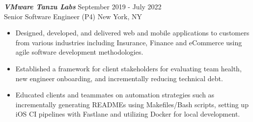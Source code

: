 {\sl \textbf{VMware Tanzu Labs}} \hfill September 2019 - July 2022 \\
Senior Software Engineer (P4) \hfill New York, NY
\begin{itemize}
    \item Designed, developed, and delivered web and mobile applications to customers from various industries including Insurance, Finance and eCommerce using agile software development methodologies.
    \item Established a framework for client stakeholders for evaluating team health, new engineer onboarding, and incrementally reducing technical debt.
    \item Educated clients and teammates on automation strategies such as incrementally generating READMEs using Makefiles/Bash scripts, setting up iOS CI pipelines with Fastlane and utilizing Docker for local development.
\end{itemize}
